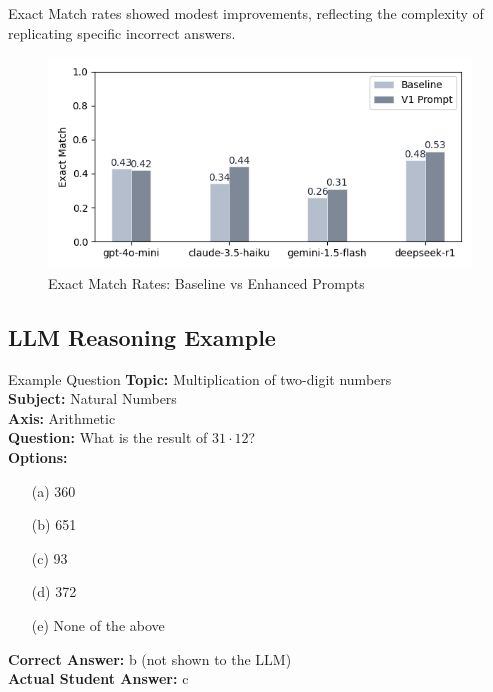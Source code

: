 \documentclass[
    a4paper, %
    10pt, %
    twoside %
]{LTJournalArticle}
\begin{document}
Exact Match rates showed modest improvements, reflecting the complexity of replicating specific incorrect answers.

\begin{figure}[H]
    \centering
    \includegraphics[width=\columnwidth]{../latex/images/exact_match_comparison.png}
    \caption{Exact Match Rates: Baseline vs Enhanced Prompts}
    \label{fig:exact-match}
\end{figure}

\subsection{LLM Reasoning Example}

\begin{questionbox}{Example Question}
    \textbf{Topic:} Multiplication of two-digit numbers \\
    \textbf{Subject:} Natural Numbers \\
    \textbf{Axis:} Arithmetic \\
    
    \textbf{Question:} What is the result of $31 \cdot 12$? \\
    
    \textbf{Options:}
    \begin{itemize}
        \item[(a)] 360
        \item[(b)] 651
        \item[(c)] 93
        \item[(d)] 372
        \item[(e)] None of the above
    \end{itemize}
    
    \textbf{Correct Answer:} b (not shown to the LLM)\\
    \textbf{Actual Student Answer:} c

\end{questionbox}
\end{document}
